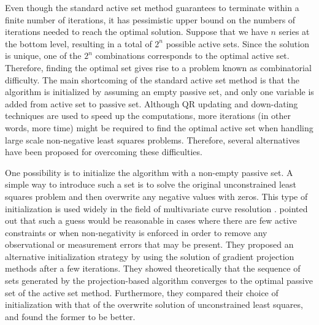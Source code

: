 \documentclass[11pt]{article}
\newcommand{\0}{\phantom{0}}
\begin{document}

Even though the standard active set method guarantees to terminate within a finite number of iterations, it has pessimistic upper bound on the numbers of iterations needed to reach the optimal solution. Suppose that we have $n$ series at the bottom level, resulting in a total of $2^{n}$ possible active sets. Since the solution is unique, one of the $2^{n}$ combinations corresponds to the optimal active set. Therefore, finding the optimal set gives rise to a problem known as combinatorial difficulty. The main shortcoming of the standard active set method is that the algorithm is initialized by assuming an empty passive set, and only one variable is added from active set to passive set. Although QR updating and down-dating techniques are used to speed up the computations, more iterations (in other words, more time) might be required to find the optimal active set when handling large scale non-negative least squares problems. Therefore, several alternatives have been proposed for overcoming these difficulties.

One possibility is to initialize the algorithm with a non-empty passive set. A simple way to introduce such a set is to solve the original unconstrained least squares problem and then overwrite any negative values with zeros. This type of initialization is used widely in the field of multivariate curve resolution \citep{Andrew1998, Gemperline2003}. \citet{Wang2012} pointed out that such a guess would be reasonable in cases where there are few active constraints or when non-negativity is enforced in order to remove any observational or measurement errors that may be present. They proposed an alternative initialization strategy by using the solution of gradient projection methods after a few iterations. They showed theoretically that the sequence of sets generated by the projection-based algorithm converges to the optimal passive set of the active set method. Furthermore, they compared their choice of initialization with that of the overwrite solution of unconstrained least squares, and found the former to be better.
\end{document}
